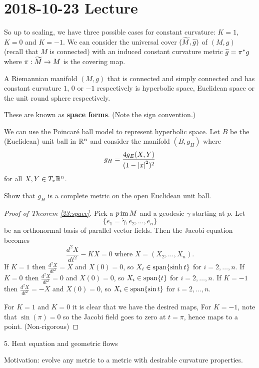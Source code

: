 \section{2018-10-23 Lecture}

So up to scaling, we have three possible cases for constant curvature: $K=1$, $K=0$ and $K=-1$.
We can consider the universal cover $(\widetilde M,\widetilde g)$ of $(M,g)$ (recall that $M$ is connected) with an induced constant curvature metric $\widetilde g=\pi^*g$ where $\pi: \widetilde M \to M$ is the covering map.

\begin{thm}\label{23:space}
  A Riemannian manifold $(M,g)$ that is connected and simply connected and has constant curvature $1$, $0$ or $-1$ respectively is hyperbolic space, Euclidean space or the unit round sphere respectively.
\end{thm}
These are known as \textbf{space forms}.
(Note the sign convention.)

We can use the Poincar\'e ball model to represent hyperbolic space.
Let $B$ be the (Euclidean) unit ball in $\mathbb{R}^n$ and consider the manifold $(B,g_H)$ where
\[ g_H = \frac{4g_E(X,Y)}{(1-\left\lvert x \right\rvert^2)^2} \]
for all $X,Y\in T_x\mathbb{R}^n$.

\begin{exer}
  Show that $g_H$ is a complete metric on the open Euclidean unit ball.
\end{exer}

\begin{proof}[Proof of Theorem \ref{23:space}]
  Pick a $p\operatorname{im} M$ and a geodesic $\gamma$ starting at $p$.
  Let
  \[ \{e_1=\dot\gamma,e_2,\ldots,e_n \} \]
  be an orthonormal basis of parallel vector fields.
  Then the Jacobi equation becomes
  \[ \frac{d^2X}{dt^2}-KX=0 \text{ where } X=(X_2,\ldots,X_n). \]
  If $K=1$ then $\tfrac{d^2X}{dt^2}=X$ and $X(0)=0$, so $X_i \in \operatorname{span}\{\sinh t\}$ for $i=2,\ldots,n$.
  If $K=0$ then $\tfrac{d^2X}{dt^2}=0$ and $X(0)=0$, so $X_i \in \operatorname{span}\{t\}$ for $i=2,\ldots,n$.
  If $K=-1$ then $\tfrac{d^2X}{dt^2}=-X$ and $X(0)=0$, so $X_i \in \operatorname{span}\{\sin t\}$ for $i=2,\ldots,n$.

  For $K=1$ and $K=0$ it is clear that we have the desired maps,
  For $K=-1$, note that $\sin(\pi)=0$ so the Jacobi field goes to zero at $t=\pi$, hence maps to a point.
  (Non-rigorous)
\end{proof}

5. Heat equation and geometric flows

Motivation: evolve any metric to a metric with desirable curvature properties.

